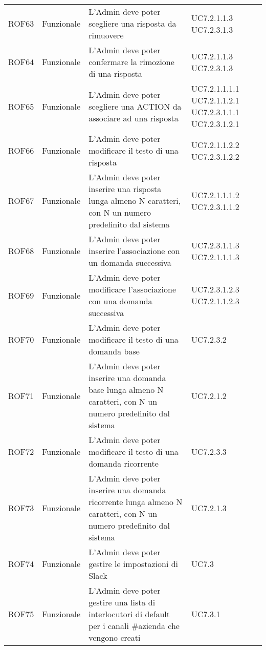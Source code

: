 \documentclass[../AnalisiDeiRequisiti_v4.0.0.tex]{subfiles}
\begin{document}
\begin{longtable}{p{2.5cm}!{\VRule[1pt]}p{2.5cm}!{\VRule[1pt]}p{5cm}!{\VRule[1pt]}p{2.5cm}}
	ROF63&Funzionale\newline  & L'Admin deve poter scegliere una risposta da rimuovere & UC7.2.1.1.3 UC7.2.3.1.3 \\
	ROF64&Funzionale\newline  & L'Admin deve poter confermare la rimozione di una risposta & UC7.2.1.1.3 UC7.2.3.1.3 \\
	ROF65&Funzionale\newline  & L'Admin deve poter scegliere una ACTION da associare ad una risposta & UC7.2.1.1.1.1 UC7.2.1.1.2.1 UC7.2.3.1.1.1 UC7.2.3.1.2.1\\
	ROF66&Funzionale\newline  & L'Admin deve poter modificare il testo di una risposta & UC7.2.1.1.2.2 UC7.2.3.1.2.2 \\
	ROF67&Funzionale\newline  & L'Admin deve poter inserire una risposta lunga almeno N caratteri, con N un numero predefinito dal sistema & UC7.2.1.1.1.2 UC7.2.3.1.1.2 \\
	ROF68&Funzionale\newline  & L'Admin deve poter inserire l'associazione con un domanda successiva & UC7.2.3.1.1.3 UC7.2.1.1.1.3 \\
	ROF69&Funzionale\newline  & L'Admin deve poter modificare l'associazione con una domanda successiva & UC7.2.3.1.2.3 UC7.2.1.1.2.3 \\
	ROF70&Funzionale\newline  & L'Admin deve poter modificare il testo di una domanda base & UC7.2.3.2 \\
	ROF71&Funzionale\newline  & L'Admin deve poter inserire una domanda base lunga almeno N caratteri, con N un numero predefinito dal sistema & UC7.2.1.2 \\
	ROF72&Funzionale\newline  & L'Admin deve poter modificare il testo di una domanda ricorrente & UC7.2.3.3 \\
	ROF73&Funzionale\newline  & L'Admin deve poter inserire una domanda ricorrente lunga almeno N caratteri, con N un numero predefinito dal sistema & UC7.2.1.3 \\
	ROF74&Funzionale\newline  & L'Admin deve poter gestire le impostazioni di Slack & UC7.3 \\
	ROF75&Funzionale\newline  & L'Admin deve poter gestire una lista di interlocutori di default per i canali \#azienda che vengono creati & UC7.3.1 \\

\end{longtable}
\end{document}
